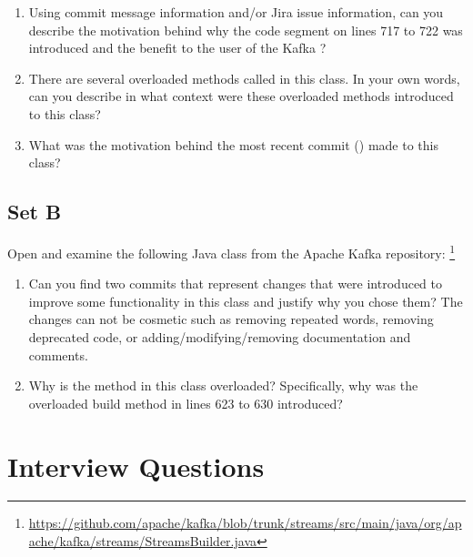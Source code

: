 \begin{enumerate}
    \item Using commit message information and/or Jira issue information, can you describe the motivation behind why the code segment on lines 717 to 722 was introduced and the benefit to the user of the Kafka ?
    \item There are several overloaded methods called  in this class. In your own words, can you describe in what context were these overloaded methods introduced to this class?
    \item What was the motivation behind the most recent commit () made to this class?
\end{enumerate}

\subsection{Set B}
\label{subsec:Question-Set-B}

Open and examine the following Java class from the Apache Kafka repository:
\footnote{\url{https://github.com/apache/kafka/blob/trunk/streams/src/main/java/org/apache/kafka/streams/StreamsBuilder.java}}

\begin{enumerate}
    \item Can you find two commits that represent changes that were introduced to improve some functionality in this class and justify why you chose them? The changes can not be cosmetic such as removing repeated words, removing deprecated code, or adding/modifying/removing documentation and comments. 
    \item Why is the  method in this class overloaded? Specifically, why was the overloaded build method in lines 623 to 630 introduced?
\end{enumerate}

\section{Interview Questions}
\label{sec:Interview-Questions}

